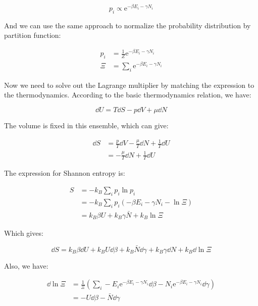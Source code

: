 \documentclass[../main.tex]{subfiles}
\begin{document}
\begin{equation}
    p_i \propto \textrm{e}^{-\beta E_i - \gamma N_i}
\end{equation}

And we can use the same approach to normalize the probability distribution by partition function:

\begin{align}
    p_i &= \frac{1}{Z}\textrm{e}^{-\beta E_i - \gamma N_i}\\
    \Xi &= \sum_{i} \textrm{e}^{-\beta E_i - \gamma N_i}
\end{align}

Now we need to solve out the Lagrange multiplier by matching the expression to the thermodynamics. According to the basic thermodynamics relation, we have:

\begin{equation}
    \dd{U} = T\dd{S} - p \dd{V} + \mu\dd{N}
\end{equation}

The volume is fixed in this ensemble, which can give:

\begin{align}
    \dd{S} &= \frac{p}{T}\dd{V} - \frac{\mu}{T}\dd{N} + \frac{1}{T}\dd{U}\nonumber\\
    &= - \frac{\mu}{T}\dd{N} + \frac{1}{T}\dd{U}
\end{align}

The expression for Shannon entropy is:

\begin{align}
    S &= -k_B \sum_{i} p_i \ln p_i\nonumber\\
    &= -k_B \sum_{i} p_i (-\beta E_i - \gamma N_i - \ln \Xi)\nonumber\\
    &= k_B \beta U + k_B\gamma \bar{N} + k_B \ln \Xi
\end{align}

Which gives:

\begin{equation}
    \dd{S} = k_B \beta \dd{U} + k_B U \dd{\beta} + k_B\bar{N}\dd{\gamma} + k_B\gamma\dd{N} + k_B \dd{\ln \Xi}
\end{equation}

Also, we have:

\begin{align}
    \dd{\ln \Xi} &= \frac{1}{\Xi}(\sum_{i} -E_i\textrm{e}^{-\beta E_i - \gamma N_i}\dd{\beta} - N_i\textrm{e}^{-\beta E_i - \gamma N_i}\dd{\gamma})\nonumber\\
    &= -U\dd{\beta} - \bar{N}\dd{\gamma}
\end{align}
\end{document}
